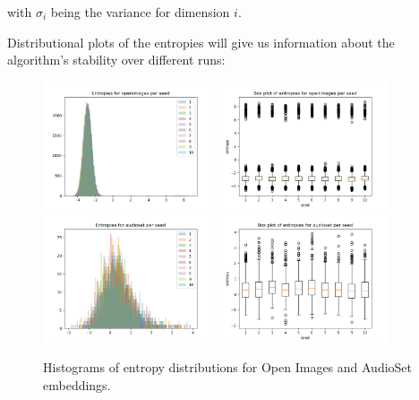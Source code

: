 with $\sigma_i$ being the variance for dimension $i$. 
 
Distributional plots of the entropies will give us information about the algorithm's stability over different runs:

\begin{figure}[H]
\label{fig:entropyindependent}
    \centering
    \includegraphics[width=0.45\textwidth]{images/method/probabilistic_independent/openimages_entropies.png}
    \includegraphics[width=0.45\textwidth]{images/method/probabilistic_independent/openimages_entropies_box.png}
    \includegraphics[width=0.45\textwidth]{images/method/probabilistic_independent/audioset_entropies.png}
    \includegraphics[width=0.45\textwidth]{images/method/probabilistic_independent/audioset_entropies_box.png}
    \caption{
        Histograms of entropy distributions for Open Images and AudioSet embeddings. 
    }
\end{figure}
 
